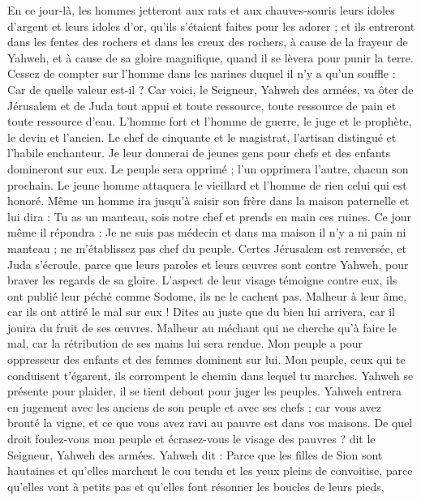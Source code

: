 \begin{multicols}{2}
En ce jour-là, les hommes jetteront aux rats et aux chauves-souris leurs idoles d'argent et leurs idoles d'or, qu'ils s'étaient faites pour les adorer ;
et ils entreront dans les fentes des rochers et dans les creux des rochers, à cause de la frayeur de Yahweh, et à cause de sa gloire magnifique, quand il se lèvera pour punir la terre.
Cessez de compter sur l'homme dans les narines duquel il n'y a qu'un souffle : Car de quelle valeur est-il ?
\VerseOne{}Car voici, le Seigneur, Yahweh des armées, va ôter de Jérusalem et de Juda tout appui et toute ressource, toute ressource de pain et toute ressource d'eau.
L'homme fort et l'homme de guerre, le juge et le prophète, le devin et l'ancien.
Le chef de cinquante et le magistrat, l'artisan distingué et l'habile enchanteur.
Je leur donnerai de jeunes gens pour chefs et des enfants domineront sur eux.
Le peuple sera opprimé ; l'un opprimera l'autre, chacun son prochain. Le jeune homme attaquera le vieillard et l'homme de rien celui qui est honoré.
Même un homme ira jusqu'à saisir son frère dans la maison paternelle et lui dira : Tu as un manteau, sois notre chef et prends en main ces ruines.
Ce jour même il répondra : Je ne suis pas médecin et dans ma maison il n'y a ni pain ni manteau ; ne m'établissez pas chef du peuple.
Certes Jérusalem est renversée, et Juda s'écroule, parce que leurs paroles et leurs œuvres sont contre Yahweh, pour braver les regards de sa gloire.
L'aspect de leur visage témoigne contre eux, ils ont publié leur péché comme Sodome, ils ne le cachent pas. Malheur à leur âme, car ils ont attiré le mal sur eux !
Dites au juste que du bien lui arrivera, car il jouira du fruit de ses œuvres.
Malheur au méchant qui ne cherche qu'à faire le mal, car la rétribution de ses mains lui sera rendue.
Mon peuple a pour oppresseur des enfants et des femmes dominent sur lui. Mon peuple, ceux qui te conduisent t'égarent, ils corrompent le chemin dans lequel tu marches.
Yahweh se présente pour plaider, il se tient debout pour juger les peuples.
Yahweh entrera en jugement avec les anciens de son peuple et avec ses chefs ; car vous avez brouté la vigne, et ce que vous avez ravi au pauvre est dans vos maisons.
De quel droit foulez-vous mon peuple et écrasez-vous le visage des pauvres ? dit le Seigneur, Yahweh des armées.
Yahweh dit : Parce que les filles de Sion sont hautaines et qu'elles marchent le cou tendu et les yeux pleins de convoitise, parce qu'elles vont à petits pas et qu'elles font résonner les boucles de leurs pieds,

\end{multicols}
